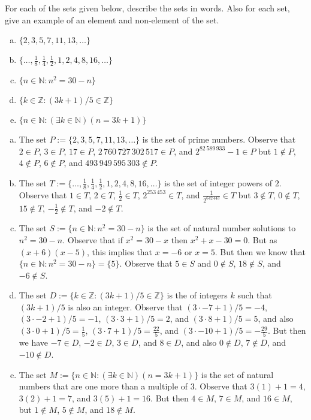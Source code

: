 \documentclass[11pt,letterpaper]{article}
\begin{document}
\newpage



 For each of the sets given below, describe the sets in words. Also for each set, give an example of an element and non-element of the set.
	\begin{enumerate}[(a)]
	\item $\{ 2, 3, 5, 7, 11, 13, \ldots \}$
	\item $\{ \ldots, \frac{1}{8}, \frac{1}{4}, \frac{1}{2}, 1, 2, 4, 8, 16, \ldots \}$
	\item $\{ n \in \mathbb{N} \colon n^2= 30 - n \}$
	\item $\{ k \in \mathbb{Z} \colon (3k + 1)/5 \in \mathbb{Z} \}$
	\item $\{ n \in \mathbb{N} \colon (\exists k \in \mathbb{N})(n= 3k + 1) \}$
	\end{enumerate} \pspace

\sol
\begin{enumerate}[(a)]
\item The set $P:= \{ 2, 3, 5, 7, 11, 13, \ldots \}$ is the set of prime numbers. Observe that $2 \in P$, $3 \in P$, $17 \in P$, $2\,760\,727\,302\,517 \in P$, and $2^{82\,589\,933} - 1 \in P$ but $1 \notin P$, $4 \notin P$, $6 \notin P$, and $493\,949\,595\,303 \notin P$. \pspace

\item The set $T:= \{ \ldots, \frac{1}{8}, \frac{1}{4}, \frac{1}{2}, 1, 2, 4, 8, 16, \ldots \}$ is the set of integer powers of $2$. Observe that $1 \in T$, $2 \in T$, $\frac{1}{2} \in T$, $2^{253\,453} \in T$, and $\frac{1}{2^{642\,443}} \in T$ but $3 \notin T$, $0 \notin T$, $15 \notin T$, $-\frac{1}{2} \notin T$, and $-2 \notin T$. \pspace

\item The set $S:= \{ n \in \mathbb{N} \colon n^2= 30 - n \}$ is the set of natural number solutions to $n^2= 30 - n$. Observe that if $x^2= 30 - x$ then $x^2 + x - 30= 0$. But as $(x + 6)(x - 5)$, this implies that $x= -6$ or $x= 5$. But then we know that $\{ n \in \mathbb{N} \colon n^2= 30 - n \}= \{ 5 \}$. Observe that $5 \in S$ and $0 \notin S$, $18 \notin S$, and $-6 \notin S$. \pspace

\item The set $D:= \{ k \in \mathbb{Z} \colon (3k + 1)/5 \in \mathbb{Z} \}$ is the of integers $k$ such that $(3k + 1)/5$ is also an integer. Observe that $(3 \cdot -7 + 1)/5= -4$, $(3 \cdot -2 + 1)/5= -1$, $(3 \cdot 3 + 1)/5= 2$, and $(3 \cdot 8 + 1)/5= 5$, and also $(3 \cdot 0 + 1)/5= \frac{1}{5}$, $(3 \cdot 7 + 1)/5= \frac{22}{5}$, and $(3 \cdot -10 + 1)/5= -\frac{29}{5}$.  But then we have $-7 \in D$, $-2 \in D$, $3 \in D$, and $8 \in D$, and also $0 \notin D$, $7 \notin D$, and $-10 \notin D$. \pspace

\item The set $M:= \{ n \in \mathbb{N} \colon (\exists k \in \mathbb{N})(n= 3k + 1) \}$ is the set of natural numbers that are one more than a multiple of 3. Observe that $3(1) + 1= 4$, $3(2) + 1= 7$, and $3(5) + 1= 16$. But then $4 \in M$, $7 \in M$, and $16 \in M$, but $1 \notin M$, $5 \notin M$, and $18 \notin M$. 
\end{enumerate}
\end{document}

